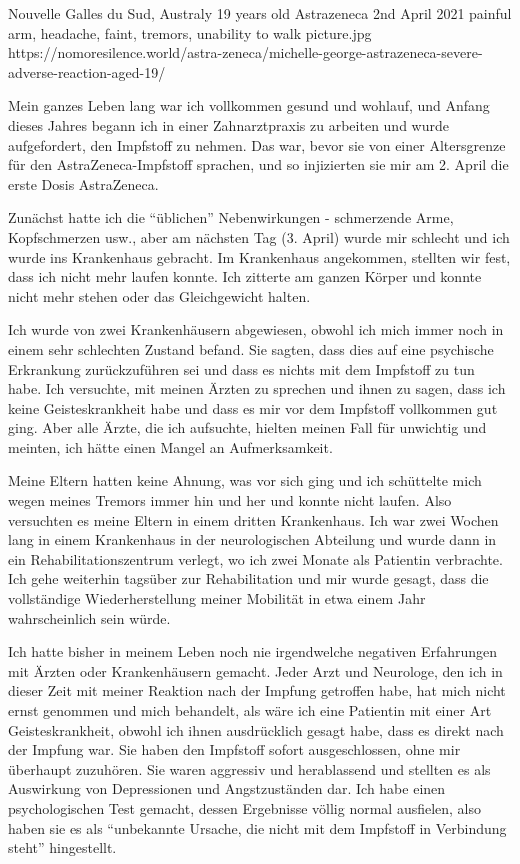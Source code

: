          {Nouvelle Galles du Sud, Australy}
          {19 years old}
          {Astrazeneca}
          {2nd April 2021}
          {painful arm, headache, faint, tremors, unability to walk}
          {picture.jpg}
          {https://nomoresilence.world/astra-zeneca/michelle-george-astrazeneca-severe-adverse-reaction-aged-19/}
          {

Mein ganzes Leben lang war ich vollkommen gesund und wohlauf, und Anfang dieses
Jahres begann ich in einer Zahnarztpraxis zu arbeiten und wurde aufgefordert,
den Impfstoff zu nehmen. Das war, bevor sie von einer Altersgrenze für den
AstraZeneca-Impfstoff sprachen, und so injizierten sie mir am 2. April die erste
Dosis AstraZeneca.

Zunächst hatte ich die “üblichen” Nebenwirkungen - schmerzende Arme,
Kopfschmerzen usw., aber am nächsten Tag (3. April) wurde mir schlecht und ich
wurde ins Krankenhaus gebracht. Im Krankenhaus angekommen, stellten wir fest,
dass ich nicht mehr laufen konnte. Ich zitterte am ganzen Körper und konnte
nicht mehr stehen oder das Gleichgewicht halten.

Ich wurde von zwei Krankenhäusern abgewiesen, obwohl ich mich immer noch in
einem sehr schlechten Zustand befand. Sie sagten, dass dies auf eine psychische
Erkrankung zurückzuführen sei und dass es nichts mit dem Impfstoff zu tun
habe. Ich versuchte, mit meinen Ärzten zu sprechen und ihnen zu sagen, dass ich
keine Geisteskrankheit habe und dass es mir vor dem Impfstoff vollkommen gut
ging. Aber alle Ärzte, die ich aufsuchte, hielten meinen Fall für unwichtig und
meinten, ich hätte einen Mangel an Aufmerksamkeit.

Meine Eltern hatten keine Ahnung, was vor sich ging und ich schüttelte mich
wegen meines Tremors immer hin und her und konnte nicht laufen. Also versuchten
es meine Eltern in einem dritten Krankenhaus. Ich war zwei Wochen lang in einem
Krankenhaus in der neurologischen Abteilung und wurde dann in ein
Rehabilitationszentrum verlegt, wo ich zwei Monate als Patientin verbrachte. Ich
gehe weiterhin tagsüber zur Rehabilitation und mir wurde gesagt, dass die
vollständige Wiederherstellung meiner Mobilität in etwa einem Jahr
wahrscheinlich sein würde.

Ich hatte bisher in meinem Leben noch nie irgendwelche negativen Erfahrungen mit
Ärzten oder Krankenhäusern gemacht. Jeder Arzt und Neurologe, den ich in dieser
Zeit mit meiner Reaktion nach der Impfung getroffen habe, hat mich nicht ernst
genommen und mich behandelt, als wäre ich eine Patientin mit einer Art
Geisteskrankheit, obwohl ich ihnen ausdrücklich gesagt habe, dass es direkt nach
der Impfung war. Sie haben den Impfstoff sofort ausgeschlossen, ohne mir
überhaupt zuzuhören. Sie waren aggressiv und herablassend und stellten es als
Auswirkung von Depressionen und Angstzuständen dar. Ich habe einen
psychologischen Test gemacht, dessen Ergebnisse völlig normal ausfielen, also
haben sie es als “unbekannte Ursache, die nicht mit dem Impfstoff in Verbindung
steht” hingestellt.

}
